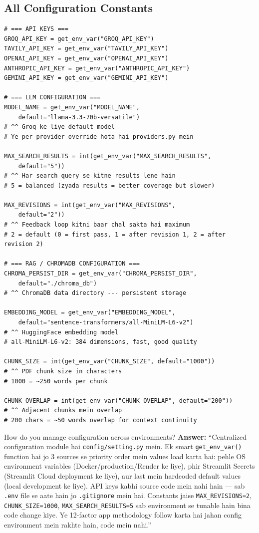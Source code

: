 \documentclass[11pt,a4paper,twoside]{report}
\begin{document}
\subsection{All Configuration Constants}

\begin{lstlisting}[style=pythonstyle,caption={config/setting.py --- All Constants}]
# === API KEYS ===
GROQ_API_KEY = get_env_var("GROQ_API_KEY")
TAVILY_API_KEY = get_env_var("TAVILY_API_KEY")
OPENAI_API_KEY = get_env_var("OPENAI_API_KEY")
ANTHROPIC_API_KEY = get_env_var("ANTHROPIC_API_KEY")
GEMINI_API_KEY = get_env_var("GEMINI_API_KEY")

# === LLM CONFIGURATION ===
MODEL_NAME = get_env_var("MODEL_NAME",
    default="llama-3.3-70b-versatile")
# ^^ Groq ke liye default model
# Ye per-provider override hota hai providers.py mein

MAX_SEARCH_RESULTS = int(get_env_var("MAX_SEARCH_RESULTS",
    default="5"))
# ^^ Har search query se kitne results lene hain
# 5 = balanced (zyada results = better coverage but slower)

MAX_REVISIONS = int(get_env_var("MAX_REVISIONS",
    default="2"))
# ^^ Feedback loop kitni baar chal sakta hai maximum
# 2 = default (0 = first pass, 1 = after revision 1, 2 = after revision 2)

# === RAG / CHROMADB CONFIGURATION ===
CHROMA_PERSIST_DIR = get_env_var("CHROMA_PERSIST_DIR",
    default="./chroma_db")
# ^^ ChromaDB data directory --- persistent storage

EMBEDDING_MODEL = get_env_var("EMBEDDING_MODEL",
    default="sentence-transformers/all-MiniLM-L6-v2")
# ^^ HuggingFace embedding model
# all-MiniLM-L6-v2: 384 dimensions, fast, good quality

CHUNK_SIZE = int(get_env_var("CHUNK_SIZE", default="1000"))
# ^^ PDF chunk size in characters
# 1000 = ~250 words per chunk

CHUNK_OVERLAP = int(get_env_var("CHUNK_OVERLAP", default="200"))
# ^^ Adjacent chunks mein overlap
# 200 chars = ~50 words overlap for context continuity
\end{lstlisting}

\begin{interviewbox}{How do you manage configuration across environments?}
\textbf{Answer:} ``Centralized configuration module hai \texttt{config/setting.py} mein. Ek smart \texttt{get\_env\_var()} function hai jo 3 sources se priority order mein values load karta hai: pehle OS environment variables (Docker/production/Render ke liye), phir Streamlit Secrets (Streamlit Cloud deployment ke liye), aur last mein hardcoded default values (local development ke liye). API keys kabhi source code mein nahi hain --- sab \texttt{.env} file se aate hain jo \texttt{.gitignore} mein hai. Constants jaise \texttt{MAX\_REVISIONS=2}, \texttt{CHUNK\_SIZE=1000}, \texttt{MAX\_SEARCH\_RESULTS=5} sab environment se tunable hain bina code change kiye. Ye 12-factor app methodology follow karta hai jahan config environment mein rakhte hain, code mein nahi.''
\end{interviewbox}
\end{document}
